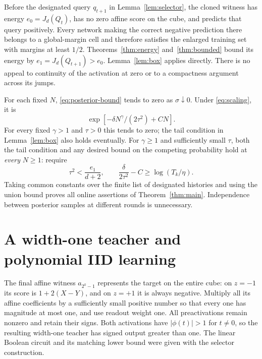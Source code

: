 \documentclass[11pt]{article}
\begin{document}
Before the designated query $q_{t+1}$ in Lemma~\ref{lem:selector}, the
cloned witness has energy $e_0=J_d(Q_t)$, has no zero affine score on
the cube, and predicts that query positively. Every network making the
correct negative prediction there belongs to a global-margin cell and
therefore satisfies the enlarged training set with margins at least
$1/2$. Theorems~\ref{thm:energy} and~\ref{thm:bounded} bound its energy by
$e_1=J_d(Q_{t+1})>e_0$. Lemma~\ref{lem:box} applies directly.
There is no appeal to continuity of the activation at zero or to a
compactness argument across its jumps.

For each fixed $N$, \eqref{eq:posterior-bound} tends to zero as
$\sigma\downarrow0$. Under \eqref{eq:scaling}, it is
\[
 \exp[-\delta N^\gamma/(2\tau^2)+CN].
\]
For every fixed $\gamma>1$ and $\tau>0$ this tends to zero; the tail
condition in Lemma~\ref{lem:box} also holds eventually.
For $\gamma\ge1$ and sufficiently small $\tau$, both the tail condition
and any desired bound on the competing probability hold at \emph{every}
$N\ge1$: require
\[
 \tau^2<\frac{e_1}{d+2},\qquad
 \frac{\delta}{2\tau^2}-C\ge\log(T_k/\eta).
\]
Taking common constants over the finite list of designated histories
and using the union bound proves all online assertions of
Theorem~\ref{thm:main}. Independence between posterior samples at different
rounds is unnecessary.

\section{A width-one teacher and polynomial IID learning}

The final affine witness $a_{2^k-1}$ represents the target on the entire
cube: on $z=-1$ its score is $1+2(X-Y)$, and on $z=+1$ it is always
negative. Multiply all its affine coefficients by a sufficiently small
positive number so that every one has magnitude at most one, and use
readout weight one. All preactivations remain nonzero and retain their
signs. Both activations have $|\phi(t)|>1$ for $t\ne0$, so the resulting
width-one teacher has signed output greater than one. The linear Boolean circuit
and its matching lower bound were given with the selector construction.
\end{document}
